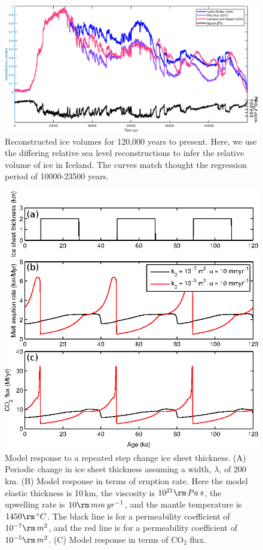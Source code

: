 \documentclass[draft,grl]{agutexSI2018}
\begin{document}
\begin{figure}
\includegraphics{../figures/version05/supp-figure2.eps}
\caption{Reconstructed ice volumes for 120,000 years to present. Here, we use the differing relative sea level reconstructions \citep{peltier-2004,pico-etal-2017,lambeck-2001} to infer the relative volume of ice in Iceland. The curves match thought the regression period of 10000-23500 years.}
\label{fg:S2}
\end{figure}

\begin{figure}
\includegraphics{../figures/version05/supp-figure5.eps}
\caption{Model response to a repeated step change ice sheet thickness. (A) Periodic change in ice sheet thickness assuming a width, $\lambda$, of 200\,km. (B) Model response in terms of eruption rate. Here the model elastic thickness is 10\,km, the viscosity is $10^{21}\rm\,Pa\,s$, the upwelling rate is $10\rm\,mm\,yr^{-1}$, and the mantle temperature is $1450\rm\,^{\circ}C$. The black line is for a permeability coefficient of $10^{-7}\rm\,m^{2}$, and the red line is for a permeability coefficient of $10^{-5}\rm\,m^{2}$. (C) Model response in terms of CO$_{2}$ flux.}
\label{fg:S3}
\end{figure}
\end{document}
